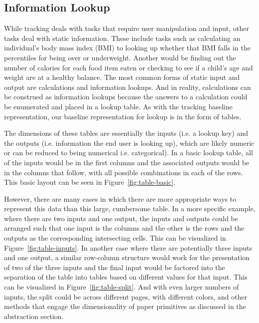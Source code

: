 \documentclass{sig-alternate}
\begin{document}
\subsection{Information Lookup}

While tracking deals with tasks that require user manipulation and input, other tasks deal with static information. These include tasks such as calculating an individual's body mass index (BMI) to looking up whether that BMI falls in the percentiles for being over or underweight. Another would be finding out the number of calories for each food item eaten or checking to see if a child's age and weight are at a healthy balance. The most common forms of static input and output are calculations and information lookups. And in reality, calculations can be construed as information lookups because the answers to a calculation could be enumerated and placed in a lookup table. As with the tracking baseline representation, our baseline representation for lookup is in the form of tables.

The dimensions of these tables are essentially the inputs (i.e. a lookup key) and the outputs (i.e. information the end user is looking up), which are likely numeric or can be reduced to being numerical i.e. categorical). In a basic lookup table, all of the inputs would be in the first columns and the associated outputs would be in the columns that follow, with all possible combinations in each of the rows. This basic layout can be seen in Figure~\ref{fig:table-basic}.

However, there are many cases in which there are more appropriate ways to represent this data than this large, cumbersome table. In a more specific example, where there are two inputs and one output, the inputs and outputs could be arranged such that one input is the columns and the other is the rows and the outputs as the corresponding intersecting cells. This can be visualized in Figure~\ref{fig:table-inputs}. In another case where there are potentially three inputs and one output, a similar row-column structure would work for the presentation of two of the three inputs and the final input would be factored into the separation of the table into tables based on different values for that input. This can be visualized in Figure~\ref{fig:table-split}. And with even larger numbers of inputs, the split could be across different pages, with different colors, and other methods that engage the dimensionality of paper primitives as discussed in the abstraction section.
\end{document}
